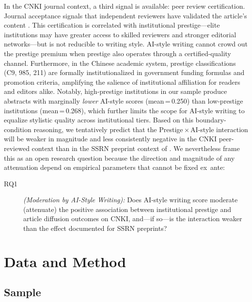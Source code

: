 \documentclass[12pt,a4paper]{article}
\begin{document}
In the CNKI journal context, a third signal is available: peer review
certification.
Journal acceptance signals that independent reviewers have validated
the article's content \citep{Bornmann2008}.
This certification is correlated with institutional prestige---elite
institutions may have greater access to skilled reviewers and stronger
editorial networks---but is not reducible to writing style.
AI-style writing cannot crowd out the prestige premium when prestige
also operates through a certified-quality channel.
Furthermore, in the Chinese academic system, prestige classifications
(C9, 985, 211) are formally institutionalized in government funding
formulas and promotion criteria, amplifying the salience of
institutional affiliation for readers and editors alike.
Notably, high-prestige institutions in our sample produce abstracts
with marginally \textit{lower} AI-style scores (mean\,=\,0.250)
than low-prestige institutions (mean\,=\,0.268), which further
limits the scope for AI-style writing to equalize stylistic quality
across institutional tiers.
Based on this boundary-condition reasoning, we tentatively predict
that the Prestige\,$\times$\,AI-style interaction will be weaker in
magnitude and less consistently negative in the CNKI peer-reviewed
context than in the SSRN preprint context of \citet{JoLi2026}.
We nevertheless frame this as an open research question because the
direction and magnitude of any attenuation depend on empirical
parameters that cannot be fixed ex~ante:
\begin{description}
  \item[RQ1] \textit{(Moderation by AI-Style Writing):}
  Does AI-style writing score moderate (attenuate) the positive
  association between institutional prestige and article diffusion
  outcomes on CNKI, and---if so---is the interaction weaker than
  the effect documented for SSRN preprints?
\end{description}

\section{Data and Method}
\label{sec:method}

\subsection{Sample}
\end{document}
